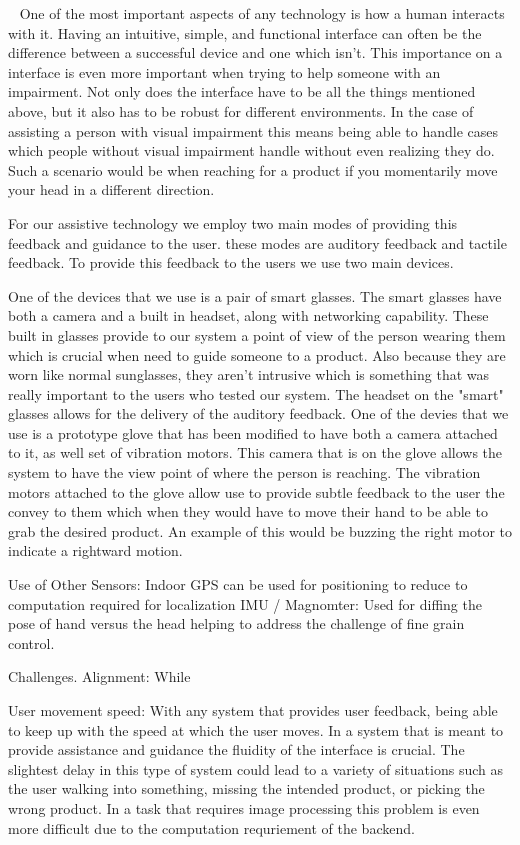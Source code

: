 ~\cite{something}
One of the most important aspects of any technology is how a human interacts with it. Having an intuitive, simple, and functional interface can often be the difference between a successful device and one which isn't. This importance on a interface is even more important when trying to help someone with an impairment. Not only does the interface have to be all the things mentioned above, but it also has to be robust for different environments. In the case of assisting a person with visual impairment this means being able to handle cases which people without visual impairment handle without even realizing they do. Such a scenario would be when reaching for a product if you momentarily move your head in a different direction.

For our assistive technology we employ two main modes of providing this feedback and guidance to the user. these modes are auditory feedback and tactile feedback. To provide this feedback to the users we use two main devices.

One of the devices that we use is a pair of smart glasses. The smart glasses have both a camera and a built in headset, along with networking capability. These built in glasses provide to our system a point of view of the person wearing them which is crucial when need to guide someone to a product. Also because they are worn like normal sunglasses, they aren't intrusive which is something that was really important to the users who tested our system. The headset on the "smart" glasses allows for the delivery of the auditory feedback.
One of the devies that we use is a prototype glove that has been modified to have both a camera attached to it, as well set of vibration motors. This camera that is on the glove allows the system to have the view point of where the person is reaching. The vibration motors attached to the glove allow use to provide subtle feedback to the user the convey to them which when they would have to move their hand to be able to grab the desired product. An example of this would be buzzing the right motor to indicate a rightward motion.




Use of Other Sensors:
    Indoor GPS
        can be used for positioning to reduce to computation required for localization
    IMU / Magnomter:
        Used for diffing the pose of hand versus the head helping to address the challenge of fine grain control.


Challenges.
    Alignment:
        While 

    User movement speed:
        With any system that provides user feedback, being able to keep up with the speed at which the user moves. In a system that is meant to provide assistance and guidance the fluidity of the interface is crucial. The slightest delay in this type of system could lead to a variety of situations such as the user walking into something, missing the intended product, or picking the wrong product. In a task that requires image processing this problem is even more difficult due to the computation requriement of the backend.



